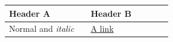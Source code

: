 \par\medskip
\begin{longtable}{|p{0.45\linewidth}|p{0.45\linewidth}|}
\hline
\textbf{Header A}

 & \textbf{Header B}

 \\
\hline
Normal and \emph{italic}

 & \href{https://example.com}{A link}

 \\
\hline
\end{longtable}
\medskip
